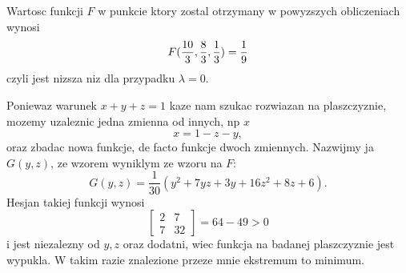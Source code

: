 \documentclass{article}[13pt]
\begin{document}
    Wartosc funkcji $F$ w punkcie ktory zostal otrzymany w powyzszych obliczeniach wynosi
    $$F({10\over3},\frac83,\frac13)=\frac19$$
    czyli jest nizsza niz dla przypadku $\lambda=0$.
    \medskip
    

    Poniewaz warunek $x+y+z=1$ kaze nam szukac rozwiazan na plaszczyznie, mozemy uzaleznic jedna zmienna od innych, np $x$ 
    $$x=1-z-y,$$
    oraz zbadac nowa funkcje, de facto funkcje dwoch zmiennych. Nazwijmy ja $G(y,z)$, ze wzorem wyniklym ze wzoru na $F$:
    $$G(y,z)=\frac1{30}(y^2+7yz+3y+16z^2+8z+6).$$
    Hesjan takiej funkcji wynosi
    $$
        \begin{bmatrix}
            2 & 7\\
            7 & 32
        \end{bmatrix}=64-49>0
    $$
    i jest niezalezny od $y,z$ oraz dodatni, wiec funkcja na badanej plaszczyznie jest wypukla. W takim razie znalezione przeze mnie ekstremum to minimum.
\end{document}
